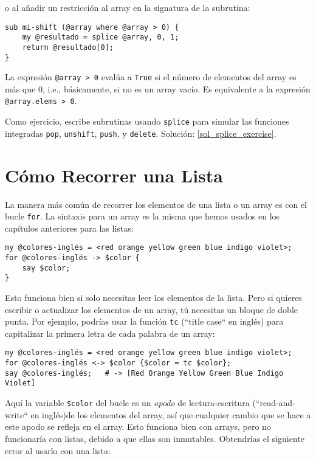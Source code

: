 o al añadir un restricción al array en la 
signatura de la subrutina:

\begin{verbatim}
sub mi-shift (@array where @array > 0) {
    my @resultado = splice @array, 0, 1;
    return @resultado[0];
}    
\end{verbatim}
%

La expresión \verb'@array > 0' evalúa a {\tt True} si el
número de elementos del array es más que 0, i.e., básicamente,
si no es un array vacío. Es equivalente a la expresión 
\verb|@array.elems > 0|.

\label{splice_exercise}
Como ejercicio, escribe subrutinas usando \verb|splice|
para simular las funciones integradas {\tt pop}, {\tt unshift}, 
{\tt push}, y {\tt delete}. Solución: \ref{sol_splice_exercise}.


\section{Cómo Recorrer una Lista}

La manera más común de recorrer los elementos de una lista
o un array es con el bucle {\tt for}. La sintaxis para un 
array es la misma que hemos usados en los capítulos
anteriores para las listas:

\begin{verbatim}
my @colores-inglés = <red orange yellow green blue indigo violet>;
for @colores-inglés -> $color {
    say $color;
}
\end{verbatim}
%
Esto funciona bien si solo necesitas leer los elementos de
la lista. Pero si quieres escribir o actualizar los elementos
de un array, tú necesitas un bloque de doble punta. Por ejemplo,
podrías usar la función {\tt tc} (``title case`` en inglés) para
capitalizar la primera letra de cada palabra de un array:

\begin{verbatim}
my @colores-inglés = <red orange yellow green blue indigo violet>;
for @colores-inglés <-> $color {$color = tc $color};
say @colores-inglés;   # -> [Red Orange Yellow Green Blue Indigo Violet]
\end{verbatim}
%
Aquí la variable \verb|$color| del bucle es un \emph{apodo} 
de lectura-escritura (``read-and-write`` en inglés)de 
los elementos del array, así que cualquier cambio 
que se hace a este apodo se refleja en el array. Esto funciona
bien con arrays, pero no funcionaría con listas, debido a que 
ellas son inmutables. Obtendrías el siguiente error al usarlo
con una lista:

